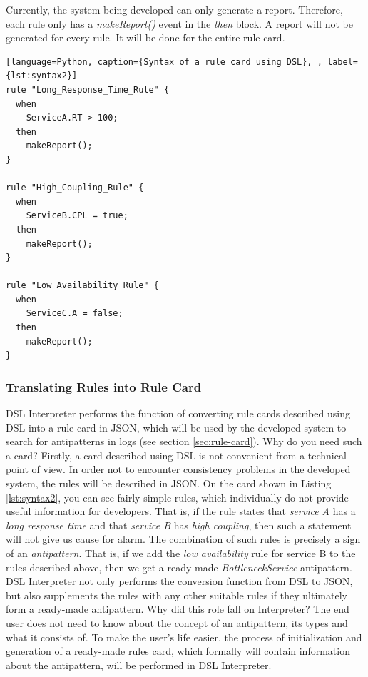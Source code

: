 \documentclass[12pt, times]{article}
\begin{document}
\hspace*{5mm}Currently, the system being developed can only generate a report. Therefore, each rule only has a \textit{makeReport()} event in the \textit{then} block. A report will not be generated for every rule. It will be done for the entire rule card.

\begin{lstlisting}[language=Python, caption={Syntax of a rule card using DSL}, , label={lst:syntaх2}]
rule "Long_Response_Time_Rule" {
  when
    ServiceA.RT > 100;
  then
    makeReport();
}

rule "High_Coupling_Rule" {
  when
    ServiceB.CPL = true;
  then
    makeReport();
}

rule "Low_Availability_Rule" {
  when
    ServiceC.A = false;
  then
    makeReport();
}
\end{lstlisting}
	
	\subsubsection*{Translating Rules into Rule Card}
	
	\hspace*{5mm}DSL Interpreter performs the function of converting rule cards described using DSL into a rule card in JSON, which will be used by the developed system to search for antipatterns in logs (see section \ref{sec:rule-card}). Why do you need such a card? Firstly, a card described using DSL is not convenient from a technical point of view. In order not to encounter consistency problems in the developed system, the rules will be described in JSON. On the card shown in Listing \ref{lst:syntaх2}, you can see fairly simple rules, which individually do not provide useful information for developers. That is, if the rule states that \textit{service A} has a \textit{long response time} and that \textit{service B} has \textit{high coupling}, then such a statement will not give us cause for alarm. The combination of such rules is precisely a sign of an \textit{antipattern}. That is, if we add the \textit{low availability} rule for service B to the rules described above, then we get a ready-made \textit{BottleneckService} antipattern. DSL Interpreter not only performs the conversion function from DSL to JSON, but also supplements the rules with any other suitable rules if they ultimately form a ready-made antipattern. Why did this role fall on Interpreter? The end user does not need to know about the concept of an antipattern, its types and what it consists of. To make the user’s life easier, the process of initialization and generation of a ready-made rules card, which formally will contain information about the antipattern, will be performed in DSL Interpreter.
	
\end{document}
